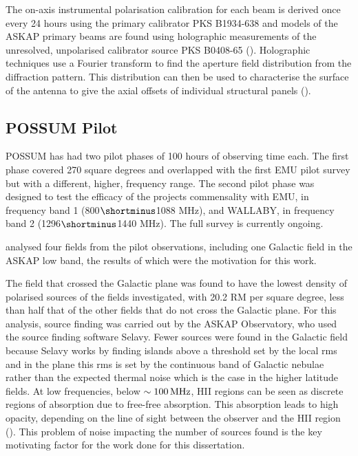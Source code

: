 The on-axis instrumental polarisation calibration for each beam is derived once every 24 hours using the primary calibrator PKS B1934-638 and models of the ASKAP primary beams are found using holographic measurements of the unresolved, unpolarised calibrator source PKS B0408-65 (\cite{POSSUM}). Holographic techniques use a Fourier transform to find the aperture field distribution from the diffraction pattern. This distribution can then be used to characterise the surface of the antenna to give the axial offsets of individual structural panels (\cite{hotan2016holographic}).

\subsection{POSSUM Pilot}

POSSUM has had two pilot phases of 100 hours of observing time each. The first phase covered 270 square degrees and overlapped with the first EMU pilot survey but with a different, higher, frequency range. The second pilot phase was designed to test the efficacy of the projects commensality with EMU, in frequency band 1 (800$\shortminus$1088 MHz), and WALLABY, in frequency band 2 (1296$\shortminus$1440 MHz). The full survey is currently ongoing. 

\cite{vanderwoude2024prototypefaradayrotationmeasure} analysed four fields from the pilot observations, including one Galactic field in the ASKAP low band, the results of which were the motivation for this work. 

The field that crossed the Galactic plane was found to have the lowest density of polarised sources of the fields investigated, with 20.2 RM per square degree, less than half that of the other fields that do not cross the Galactic plane. For this analysis, source finding was carried out by the ASKAP Observatory, who used the source finding software Selavy. Fewer sources were found in the Galactic field because Selavy works by finding islands above a threshold set by the local rms and in the plane this rms is set by the continuous band of Galactic nebulae rather than the expected thermal noise which is the case in the higher latitude fields. At low frequencies, below $\sim 100\,{\rm MHz}$, HII regions can be seen as discrete regions of absorption due to free-free absorption. This absorption leads to high opacity, depending on the line of sight between the observer and the HII region (\cite{free_free}). This problem of noise impacting the number of sources found is the key motivating factor for the work done for this dissertation.



